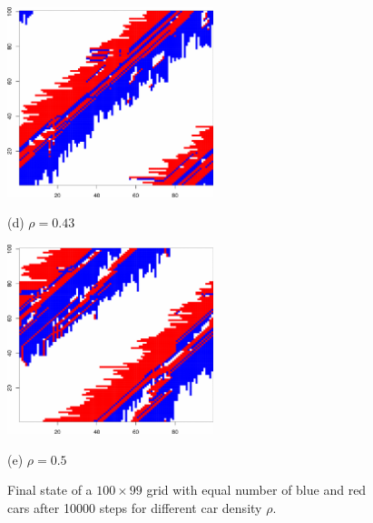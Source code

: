 \documentclass{article}
\begin{document}
\begin{figure}[H]
    \hfill
    \begin{minipage}[b]{0.5\linewidth}
      \centering
      \centerline{\includegraphics[width=6.0cm]{./figs/TestBehavior_100_99_10000_043_end.pdf}}
      \centerline{(d) $\rho = 0.43$}\medskip
    \end{minipage}
    \hfill
    \begin{minipage}[b]{1\linewidth}
      \centering
      \centerline{\includegraphics[width=6.0cm]{./figs/TestBehavior_100_99_10000_05_end.pdf}}
      \centerline{(e) $\rho = 0.5$}\medskip
    \end{minipage}
    \caption{Final state of a $100\times99$ grid with equal number of blue and
    red cars after 10000 steps for different car density $\rho$.}
    \label{fig:final_state}
\end{figure}
\end{document}
